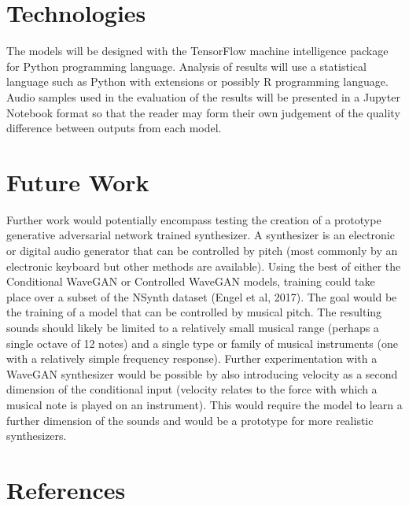 \documentclass{article}
\begin{document}
\section{Technologies}

The models will be designed with the TensorFlow machine intelligence package for Python programming language.
Analysis of results will use a statistical language such as Python with extensions or possibly R programming language.
Audio samples used in the evaluation of the results will be presented in a Jupyter Notebook format so that the reader may form their own judgement of the quality difference between outputs from each model.

\section{Future Work}

Further work would potentially encompass testing the creation of a prototype generative adversarial network trained synthesizer.
A synthesizer is an electronic or digital audio generator that can be controlled by pitch (most commonly by an electronic keyboard but other methods are available).
Using the best of either the Conditional WaveGAN or Controlled WaveGAN models, training could take place over a subset of the NSynth dataset (Engel et al, 2017).
\newline
\newline
The goal would be the training of a model that can be controlled by musical pitch.
The resulting sounds should likely be limited to a relatively small musical range (perhaps a single octave of 12 notes) and a single type or family of musical instruments (one with a relatively simple frequency response).
\newline
\newline
Further experimentation with a WaveGAN synthesizer would be possible by also introducing velocity as a second dimension of the conditional input (velocity relates to the force with which a musical note is played on an instrument).
This would require the model to learn a further dimension of the sounds and would be a prototype for more realistic synthesizers.

\section{References}
\end{document}
